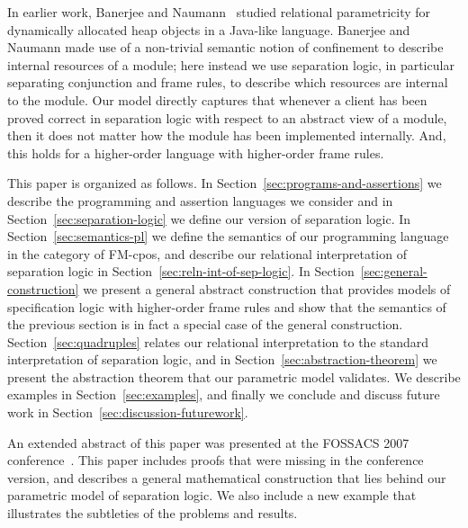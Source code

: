 \documentclass{LMCS}
\begin{document}
In earlier work, Banerjee and Naumann~\cite{banerjee:naumann:jacm} studied
relational parametricity for dynamically allocated heap objects in a
Java-like language. Banerjee and Naumann made use of a non-trivial semantic
notion of confinement to describe internal resources of a module; here
instead we use separation logic, in particular separating conjunction and
frame rules, to describe which resources are internal to the module.  Our
model directly captures that whenever a client has been proved correct in
separation logic with respect to an abstract view of a module, then it does
not matter how the module has been implemented internally. And, this holds
for a higher-order language with higher-order frame rules.

This paper is organized as follows.
In Section~\ref{sec:programs-and-assertions} we describe the
programming and assertion languages we consider and in
Section~\ref{sec:separation-logic} we define our version of separation
logic.  In Section~\ref{sec:semantics-pl} we define the semantics of our
programming language in the category of FM-cpos, and describe our
relational interpretation of separation logic in
Section~\ref{sec:reln-int-of-sep-logic}. In
Section~\ref{sec:general-construction} we present a general abstract
construction that provides models of specification logic with higher-order
frame rules and show that the semantics of the previous section is in fact
a special case of the general construction. 
Section~\ref{sec:quadruples}
relates our relational interpretation to the standard interpretation of
separation logic, and in Section~\ref{sec:abstraction-theorem} we present
the abstraction theorem that our parametric model validates. 
We describe examples in Section~\ref{sec:examples}, and
finally we conclude and discuss future work in
Section~\ref{sec:discussion-futurework}.

An extended abstract of this paper was presented at the FOSSACS 2007
conference~\cite{birkedal-yang-fossacs07}. This paper includes proofs that
were missing in the conference version, and describes a general
mathematical construction that lies behind our parametric model of
separation logic. We also include a new example that illustrates the
subtleties of the problems and results.
\end{document}

